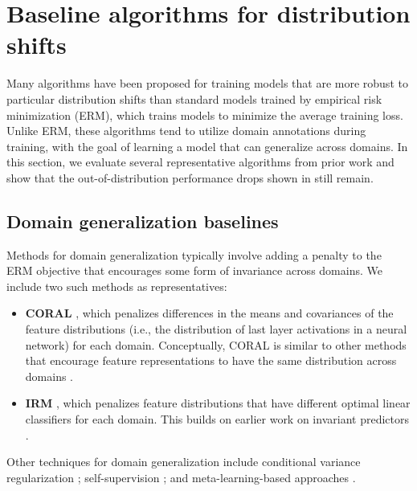 \section{Baseline algorithms for distribution shifts}\label{sec:baselines}

Many algorithms have been proposed for training models that are more robust to particular distribution shifts than standard models trained by empirical risk minimization (ERM), which trains models to minimize the average training loss.
Unlike ERM, these algorithms tend to utilize domain annotations during training, with the goal of learning a model that can generalize across domains.
In this section, we evaluate several representative algorithms from prior work and show that the out-of-distribution performance drops shown in  still remain.

\subsection{Domain generalization baselines}
Methods for domain generalization typically involve adding a penalty to the ERM objective that encourages some form of invariance across domains.
We include two such methods as representatives:
\begin{itemize}
  \item \textbf{CORAL} \citep{sun2016deep}, which penalizes differences in the means and covariances of the feature distributions (i.e., the distribution of last layer activations in a neural network) for each domain.
  Conceptually, CORAL is similar to other methods that encourage feature representations to have the same distribution across domains
  \citep{tzeng2014domain,long2015learning,ganin2016domain,li2018deep,li2018domain}.
  \item \textbf{IRM} \citep{arjovsky2019invariant}, which penalizes feature distributions that have different optimal linear classifiers for each domain. This builds on earlier work on invariant predictors \citep{peters2016causal}.
\end{itemize}
Other techniques for domain generalization include
conditional variance regularization \citep{heinze2017conditional};
self-supervision \citep{carlucci2019domain};
and meta-learning-based approaches \citep{li2018learning,balaji2018metareg,dou19neurips}.

